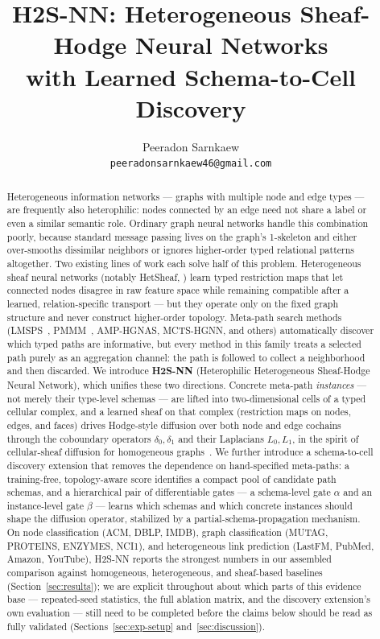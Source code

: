 \documentclass{article}
\title{H2S-NN: Heterogeneous Sheaf-Hodge Neural Networks \\ with Learned Schema-to-Cell Discovery}
\author{
  Peeradon Sarnkaew \\
  \texttt{peeradonsarnkaew46@gmail.com} \\
}
\begin{document}
\maketitle

\begin{abstract}
Heterogeneous information networks --- graphs with multiple node and edge types --- are frequently
also heterophilic: nodes connected by an edge need not share a label or even a similar semantic
role. Ordinary graph neural networks handle this combination poorly, because standard message
passing lives on the graph's 1-skeleton and either over-smooths dissimilar neighbors or ignores
higher-order typed relational patterns altogether. Two existing lines of work each solve half of
this problem. Heterogeneous sheaf neural networks (notably HetSheaf, \citealp{braithwaite2024hetsheaf})
learn typed restriction maps that let connected nodes disagree in raw feature space while remaining
compatible after a learned, relation-specific transport --- but they operate only on the fixed graph
structure and never construct higher-order topology. Meta-path search methods
(LMSPS~\citep{yan2024lmsps}, PMMM~\citep{jiang2022pmmm}, AMP-HGNAS, MCTS-HGNN, and others) automatically
discover which typed paths are informative, but every method in this family treats a selected path
purely as an aggregation channel: the path is followed to collect a neighborhood and then discarded.
We introduce \textbf{H2S-NN} (Heterophilic Heterogeneous Sheaf-Hodge Neural Network), which unifies
these two directions. Concrete meta-path \emph{instances} --- not merely their type-level schemas
--- are lifted into two-dimensional cells of a typed cellular complex, and a learned sheaf on that
complex (restriction maps on nodes, edges, and faces) drives Hodge-style diffusion over both node and
edge cochains through the coboundary operators $\delta_0,\delta_1$ and their Laplacians $L_0,L_1$,
in the spirit of cellular-sheaf diffusion for homogeneous graphs~\citep{bodnar2022neural}. We further
introduce a schema-to-cell discovery extension that removes the dependence on hand-specified
meta-paths: a training-free, topology-aware score identifies a compact pool of candidate path
schemas, and a hierarchical pair of differentiable gates --- a schema-level gate $\alpha$ and an
instance-level gate $\beta$ --- learns which schemas and which concrete instances should shape the
diffusion operator, stabilized by a partial-schema-propagation mechanism. On node classification
(ACM, DBLP, IMDB), graph classification (MUTAG, PROTEINS, ENZYMES, NCI1), and heterogeneous link
prediction (LastFM, PubMed, Amazon, YouTube), H2S-NN reports the strongest numbers in our assembled
comparison against homogeneous, heterogeneous, and sheaf-based baselines (Section~\ref{sec:results});
we are explicit throughout about which parts of this evidence base --- repeated-seed statistics, the
full ablation matrix, and the discovery extension's own evaluation --- still need to be completed
before the claims below should be read as fully validated (Sections~\ref{sec:exp-setup}
and~\ref{sec:discussion}).
\end{abstract}
\end{document}
